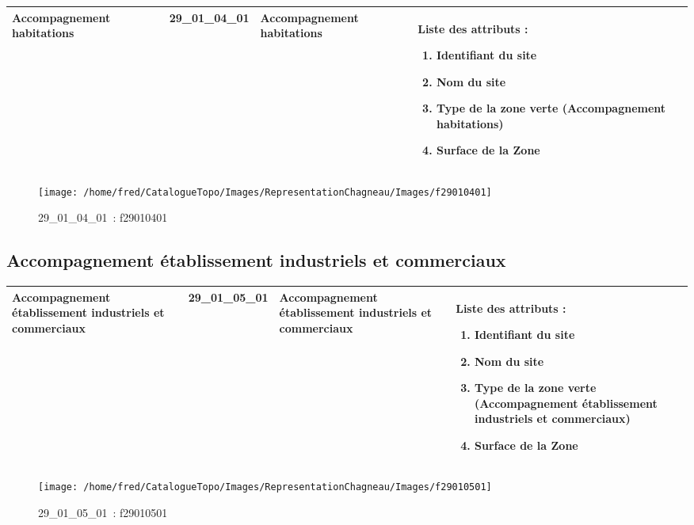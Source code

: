 \documentclass[12pt,titlepage]{book}
\begin{document}
\renewcommand{\arraystretch}{1.2}
\begin{supertabular}{|p{10cm}|c|p{13cm}|p{12cm}|}
 Accompagnement habitations & 29\_01\_04\_01 & Accompagnement habitations & Liste des attributs :
\begin{enumerate}
  \item Identifiant du site  \item Nom du site  \item Type de la zone verte (Accompagnement habitations)  \item Surface de la Zone\end{enumerate}
\\
\hline
\end{supertabular}
\begin{figure}[h!]
  \hfill         %
  \begin{minipage}[t]{3cm}
    \begin{center}
      \texttt{[image: /home/fred/CatalogueTopo/Images/RepresentationChagneau/Images/f29010401]}
      \caption[~29\_01\_04\_01]{\small{29\_01\_04\_01~:} \tiny{f29010401}}\label{f29010401}
    \end{center}
  \end{minipage}
\end{figure}


\subsection{Accompagnement établissement industriels et commerciaux}
\noindent
\vspace{\baselineskip}

\renewcommand{\arraystretch}{1.2}
\begin{supertabular}{|p{10cm}|c|p{13cm}|p{12cm}|}
 Accompagnement établissement industriels et commerciaux & 29\_01\_05\_01 & Accompagnement établissement industriels et commerciaux & Liste des attributs :
\begin{enumerate}
  \item Identifiant du site  \item Nom du site  \item Type de la zone verte (Accompagnement établissement industriels et commerciaux)  \item Surface de la Zone\end{enumerate}
\\
\hline
\end{supertabular}
\begin{figure}[h!]
  \hfill         %
  \begin{minipage}[t]{3cm}
    \begin{center}
      \texttt{[image: /home/fred/CatalogueTopo/Images/RepresentationChagneau/Images/f29010501]}
      \caption[~29\_01\_05\_01]{\small{29\_01\_05\_01~:} \tiny{f29010501}}\label{f29010501}
    \end{center}
  \end{minipage}
\end{figure}
\end{document}
